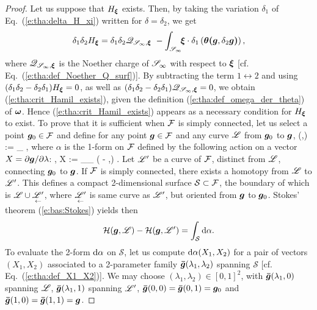 \begin{proof}
Let us suppose that $H_{\bm{\xi}}$ exists. Then, by taking the variation $\delta_1$
of Eq.~(\ref{e:tha:delta_H_xi}) written for $\delta = \delta_2$, we get
\[
    \delta_1 \delta_2 H_{\bm{\xi}} = \delta_1 \delta_2 \mathscr{Q}_{\mathscr{S}_\infty,\bm{\xi}}
    \ -  \int_{\mathscr{S}_\infty} \!\! \bm{\xi}\cdot\delta_1\left(\bm{\theta}\textbf{(}\bm{g},\delta_2\bm{g}\textbf{)}\right)  ,
\]
where $\mathscr{Q}_{\mathscr{S}_\infty,\bm{\xi}}$ is the
Noether charge of $\mathscr{S}_\infty$ with respect to $\bm{\xi}$
[cf. Eq.~(\ref{e:tha:def_Noether_Q_surf})].
By subtracting the term $1\leftrightarrow 2$ and using
$(\delta_1 \delta_2 - \delta_2 \delta_1) H_{\bm{\xi}} = 0$, as well
as $(\delta_1 \delta_2 - \delta_2 \delta_1) \mathscr{Q}_{\mathscr{S}_\infty,\bm{\xi}} = 0$,
we obtain (\ref{e:tha:crit_Hamil_exists}), given the definition (\ref{e:tha:def_omega_der_theta})
of $\bm{\omega}$. Hence (\ref{e:tha:crit_Hamil_exists}) appears as a necessary
condition for $H_{\bm{\xi}}$ to exist.
To prove that it is sufficient when $\mathcal{F}$ is simply connected, let us select
a point $\bm{g}_0\in\mathcal{F}$ and define for any point $\bm{g}\in\mathcal{F}$ and any
curve $\mathscr{L}$ from $\bm{g}_0$ to $\bm{g}$,
\be  \label{e:tha:def_H_g_Li}
    (,\Li) := \int_{\Li} \alpha ,
\ee
where $\alpha$ is the 1-form on $\mathcal{F}$ defined by the following action on
a vector $X = {\partial \bm{g}}/{\partial \lambda}$:
\be  \label{e:tha:def_alpha_X}
    \langle\alpha, X \rangle :=
    \int_{\Sp_\infty}\!\! \left(  \der{}{\lambda} \lld\w{\xi}\rld
    - \w{\xi}\cdot\w{\theta}\Lld{},\Rld \right) .
\ee
Let $\mathscr{L}'$ be a curve of $\mathcal{F}$, distinct from $\mathscr{L}$, connecting $\bm{g}_0$ to $\bm{g}$.
If $\mathcal{F}$ is simply connected, there exists a homotopy from $\mathscr{L}$ to $\mathscr{L}'$.
This defines a compact 2-dimensional surface $\mathcal{S}\subset\mathcal{F}$, the boundary of which is
$\mathscr{L}\cup \underset{\leftarrow}{\mathscr{L}'}$, where $\underset{\leftarrow}{\mathscr{L}'}$ is
same curve as $\mathscr{L}'$, but oriented from $\bm{g}$ to $\bm{g}_0$.
Stokes' theorem (\ref{e:bas:Stokes}) yields then
\[
    \mathcal{H}(\bm{g},\mathscr{L}) - \mathcal{H}(\bm{g},\mathscr{L}') = \int_{\mathcal{S}} \mathrm{d} \alpha .
\]
To evaluate the 2-form $\mathrm{d} \alpha$ on $\mathcal{S}$, let us compute
$\mathrm{d} \alpha(X_1,X_2)$ for a pair of vectors $(X_1,X_2)$ associated to a
2-parameter family $\bm{\bar{g}}(\lambda_1,\lambda_2)$ spanning $\mathcal{S}$
[cf. Eq.~(\ref{e:tha:def_X1_X2})]. We may choose $(\lambda_1,\lambda_2)\in[0,1]^2$,
with $\bm{\bar{g}}(\lambda_1,0)$ spanning $\mathscr{L}$, $\bm{\bar{g}}(\lambda_1,1)$ spanning $\mathscr{L}'$,
$\bm{\bar{g}}(0,0) = \bm{\bar{g}}(0,1) = \bm{g}_0$ and $\bm{\bar{g}}(1,0) = \bm{\bar{g}}(1,1) = \bm{g}$.

\end{proof}
